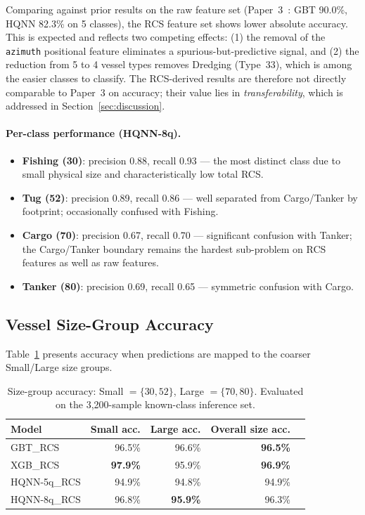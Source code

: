 \documentclass[journal]{IEEEtran}
\begin{document}
Comparing against prior results on the raw feature set
(Paper~3~\cite{paper3qml}: GBT 90.0\%, HQNN 82.3\% on 5 classes), the
RCS feature set shows lower absolute accuracy. This is expected and
reflects two competing effects: (1) the removal of the \texttt{azimuth}
positional feature eliminates a spurious-but-predictive signal, and
(2) the reduction from 5 to 4 vessel types removes Dredging (Type~33),
which is among the easier classes to classify. The RCS-derived results
are therefore not directly comparable to Paper~3 on accuracy; their
value lies in \emph{transferability}, which is addressed in
Section~\ref{sec:discussion}.

\paragraph{Per-class performance (HQNN-8q).}
\begin{itemize}
  \item \textbf{Fishing (30)}: precision 0.88, recall 0.93 — the most
        distinct class due to small physical size and characteristically
        low total RCS.
  \item \textbf{Tug (52)}: precision 0.89, recall 0.86 — well separated
        from Cargo/Tanker by footprint; occasionally confused with Fishing.
  \item \textbf{Cargo (70)}: precision 0.67, recall 0.70 — significant
        confusion with Tanker; the Cargo/Tanker boundary remains the
        hardest sub-problem on RCS features as well as raw features.
  \item \textbf{Tanker (80)}: precision 0.69, recall 0.65 — symmetric
        confusion with Cargo.
\end{itemize}

\subsection{Vessel Size-Group Accuracy}
\label{sec:size_results}

Table~\ref{tab:size_results} presents accuracy when predictions are
mapped to the coarser Small/Large size groups.

\begin{table}[H]
\centering
\caption{Size-group accuracy: Small $= \{30, 52\}$, Large $= \{70, 80\}$.
         Evaluated on the 3,200-sample known-class inference set.}
\label{tab:size_results}
\begin{tabular}{lrrrr}
\toprule
\textbf{Model} & \textbf{Small acc.} & \textbf{Large acc.} & \textbf{Overall size acc.} \\
\midrule
GBT\_RCS      & 96.5\% & 96.6\% & \textbf{96.5\%} \\
XGB\_RCS      & \textbf{97.9\%} & 95.9\% & \textbf{96.9\%} \\
HQNN-5q\_RCS  & 94.9\% & 94.8\% & 94.9\% \\
HQNN-8q\_RCS  & 96.8\% & \textbf{95.9\%} & 96.3\% \\
\bottomrule
\end{tabular}
\end{table}
\end{document}
